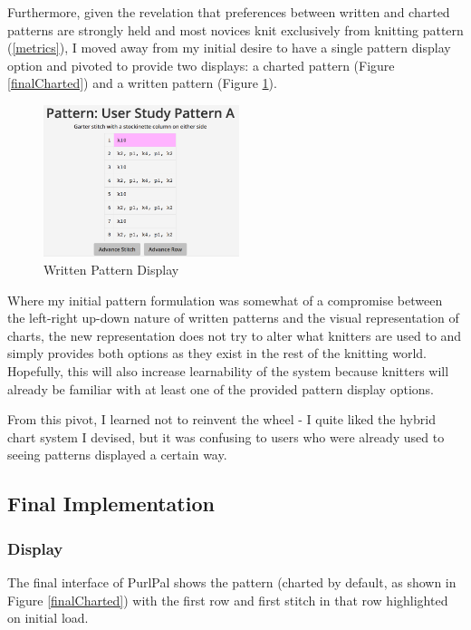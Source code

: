 \documentclass[11pt,twocolumn]{article}
\begin{document}
Furthermore, given the revelation that preferences between written and charted patterns are strongly held and most novices knit exclusively from knitting pattern (\ref{metrics}),
I moved away from my initial desire to have a single pattern display option and pivoted to provide two displays: a charted pattern (Figure \ref{finalCharted}) and a written pattern (Figure \ref{finalWritten}).
\begin{figure}
  \begin{center}
    \includegraphics[width=2.25in]{finalWritten}
    \caption{Written Pattern Display} \label{finalWritten}
  \end{center}
\end{figure}
Where my initial pattern formulation was somewhat of a compromise between the left-right up-down nature of written patterns and the visual representation of charts,
the new representation does not try to alter what knitters are used to and simply provides both options as they exist in the rest of the knitting world.
Hopefully, this will also increase learnability of the system because knitters will already be familiar with at least one of the provided pattern display options.

From this pivot, I learned not to reinvent the wheel - I quite liked the hybrid chart system I devised, but it was confusing to users who were already used to seeing patterns displayed a certain way.

\subsection{Final Implementation} \label{implementation}

\subsubsection{Display}

The final interface of PurlPal shows the pattern (charted by default, as shown in Figure \ref{finalCharted}) with the first row and first stitch in that row highlighted on initial load.
\end{document}

